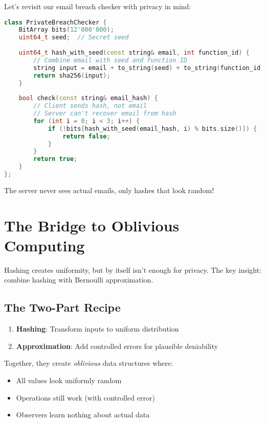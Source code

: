 \begin{example}
Let's revisit our email breach checker with privacy in mind:

\begin{lstlisting}[language=C++]
class PrivateBreachChecker {
    BitArray bits(12'000'000);
    uint64_t seed;  // Secret seed
    
    uint64_t hash_with_seed(const string& email, int function_id) {
        // Combine email with seed and function ID
        string input = email + to_string(seed) + to_string(function_id);
        return sha256(input);
    }
    
    bool check(const string& email_hash) {
        // Client sends hash, not email
        // Server can't recover email from hash
        for (int i = 0; i < 3; i++) {
            if (!bits[hash_with_seed(email_hash, i) % bits.size()]) {
                return false;
            }
        }
        return true;
    }
};
\end{lstlisting}

The server never sees actual emails, only hashes that look random!
\end{example}

\section{The Bridge to Oblivious Computing}

Hashing creates uniformity, but by itself isn't enough for privacy. The key insight: combine hashing with Bernoulli approximation.

\subsection{The Two-Part Recipe}

\begin{enumerate}
    \item \textbf{Hashing}: Transform inputs to uniform distribution
    \item \textbf{Approximation}: Add controlled errors for plausible deniability
\end{enumerate}

Together, they create \emph{oblivious} data structures where:
\begin{itemize}
    \item All values look uniformly random
    \item Operations still work (with controlled error)
    \item Observers learn nothing about actual data
\end{itemize}

